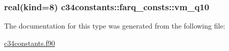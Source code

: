 \subsubsection[{\texorpdfstring{vm\+\_\+q10}{vm_q10}}]{\setlength{\rightskip}{0pt plus 5cm}real(kind=8) c34constants\+::farq\+\_\+consts\+::vm\+\_\+q10}\hypertarget{structc34constants_1_1farq__consts_a6f62b2ef08a8e18c71f2af508abeb173}{}\label{structc34constants_1_1farq__consts_a6f62b2ef08a8e18c71f2af508abeb173}


The documentation for this type was generated from the following file\+:\begin{DoxyCompactItemize}
\item 
\hyperlink{c34constants_8f90}{c34constants.\+f90}\end{DoxyCompactItemize}
